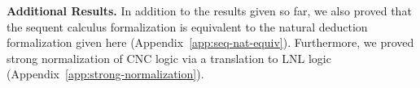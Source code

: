 \textbf{Additional Results.} In addition to the results given so far, we
also proved that the sequent calculus formalization is equivalent to the
natural deduction formalization given here
(Appendix~\ref{app:seq-nat-equiv}). Furthermore, we proved strong
normalization of CNC logic via a translation to LNL logic
(Appendix~\ref{app:strong-normalization}).





